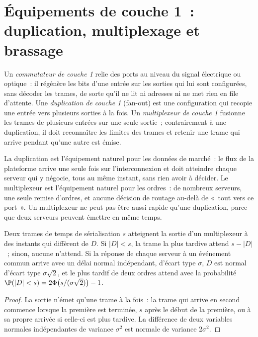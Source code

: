 \section{Équipements de couche 1~: duplication, multiplexage et brassage}

\begin{definition}\label{def:nw:switches-and-layer-1-devices:l1}
Un \emph{commutateur de couche 1} relie des ports au niveau du signal électrique ou optique~: il régénère
les bits d'une entrée sur les sorties qui lui sont configurées, sans décoder les trames, de sorte qu'il ne lit ni adresses ni ne met rien en file d'attente. Une
\emph{duplication de couche 1} (fan-out) est une configuration qui recopie une entrée vers plusieurs sorties à la fois. Un
\emph{multiplexeur de couche 1} fusionne les trames de plusieurs entrées sur une seule sortie~; contrairement à une duplication, il doit
reconnaître les limites des trames et retenir une trame qui arrive pendant qu'une autre est émise.
\end{definition}

La duplication est l'équipement naturel pour les données de marché~: le flux de la plateforme arrive une seule fois sur l'interconnexion et doit atteindre chaque
serveur qui y négocie, tous au même instant, sans rien avoir à décider. Le multiplexeur est l'équipement naturel pour les ordres~: de nombreux
serveurs, une seule remise d'ordres, et aucune décision de routage au-delà de «~tout vers ce port~». Un multiplexeur ne peut pas être aussi rapide qu'une duplication,
parce que deux serveurs peuvent émettre en même temps.

\begin{proposition}\label{prop:nw:switches-and-layer-1-devices:mux}
Deux trames de temps de sérialisation $s$ atteignent la sortie d'un multiplexeur à des instants qui diffèrent de $D$. Si $|D| < s$, la trame la plus tardive attend
$s - |D|$~; sinon, aucune n'attend. Si la réponse de chaque serveur à un événement commun arrive avec un délai normal indépendant,
d'écart type $\sigma$, $D$ est normal d'écart type $\sigma\sqrt2$, et le plus tardif de deux ordres attend avec
la probabilité $\P(|D| < s) = 2\Phi\bigl(s/(\sigma\sqrt2)\bigr) - 1$.
\end{proposition}

\begin{proof}
La sortie n'émet qu'une trame à la fois~: la trame qui arrive en second commence lorsque la première est terminée, $s$ après le
début de la première, ou à sa propre arrivée si celle-ci est plus tardive. La différence de deux variables normales indépendantes de variance $\sigma^2$ est
normale de variance $2\sigma^2$.
\end{proof}

